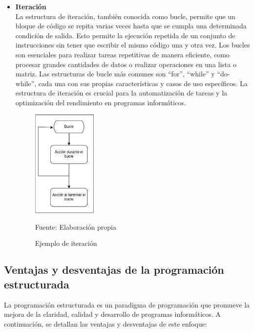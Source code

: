 \begin{itemize}
  \item \textbf{Iteración} \\
  La estructura de iteración, también conocida como bucle, permite que un bloque de código se repita varias veces hasta que se cumpla una determinada condición de salida. Esto permite la ejecución repetida de un conjunto de instrucciones sin tener que escribir el mismo código una y otra vez. Los bucles son esenciales para realizar tareas repetitivas de manera eficiente, como procesar grandes cantidades de datos o realizar operaciones en una lista o matriz. Las estructuras de bucle más comunes son ``for'', ``while'' y ``do-while'', cada una con sus propias características y casos de uso específicos. La estructura de iteración es crucial para la automatización de tareas y la optimización del rendimiento en programas informáticos.
  \begin{figure}[!h]
    \centering
    \includegraphics[width=0.3\textwidth]{images/iteracion.png}
    \caption{Ejemplo de iteración}
    \centering Fuente: Elaboración propia
    \label{fig:iteracion}
  \end{figure}
  \newline
\end{itemize}
\newpage

\subsection{Ventajas y desventajas de la programación estructurada}
La programación estructurada es un paradigma de programación que promueve la mejora de la claridad, calidad y desarrollo de programas informáticos. A continuación, se detallan las ventajas y desventajas de este enfoque:

